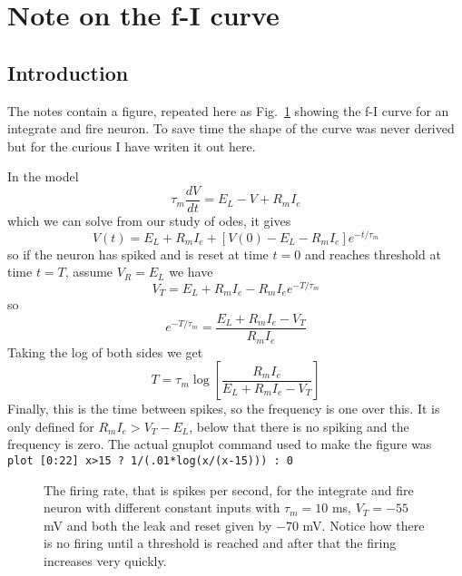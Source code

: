 \documentclass{article}
\begin{document}
\section*{Note on the f-I curve}

\subsection*{Introduction}

The notes contain a figure, repeated here as Fig.~\ref{f_i_curve}
showing the f-I curve for an integrate and fire neuron. To save time
the shape of the curve was never derived but for the curious I have
writen it out here.

In the model 
\begin{equation}
\tau_m\frac{dV}{dt}=E_L-V+R_mI_e
\end{equation}
which we can solve from our study of odes, it gives
\begin{equation}
V(t)=E_L+R_mI_e+[V(0)-E_L-R_mI_e]e^{-t/\tau_m}
\end{equation}
so if the neuron has spiked and is reset at time $t=0$ and reaches
threshold at time $t=T$, assume $V_R=E_L$ we have
\begin{equation}
V_T=E_L+R_mI_e-R_mI_ee^{-T/\tau_m}
\end{equation}
so 
\begin{equation}
e^{-T/\tau_m}=\frac{E_L+R_mI_e-V_T}{R_mI_e}
\end{equation}
Taking the log of both sides we get
\begin{equation}
T=\tau_m\log\left[\frac{R_mI_e}{E_L+R_mI_e-V_T}\right]
\end{equation}
Finally, this is the time between spikes, so the frequency is one over this. It is only defined for $R_mI_e>V_T-E_L$, below that there is no spiking and the frequency is zero. The actual gnuplot command used to make the figure was\\
\texttt{plot [0:22] x>15 ? 1/(.01*log(x/(x-15))) : 0}

\begin{figure}
\begin{center}

\end{center}
\caption{The firing rate, that is spikes per second, for the integrate
  and fire neuron with different constant inputs with $\tau_m=10$ ms,
  $V_T=-55$ mV and both the leak and reset given by $-70$ mV. Notice
  how there is no firing until a threshold is reached and after that
  the firing increases very quickly. \label{f_i_curve}}
\end{figure}
\end{document}
